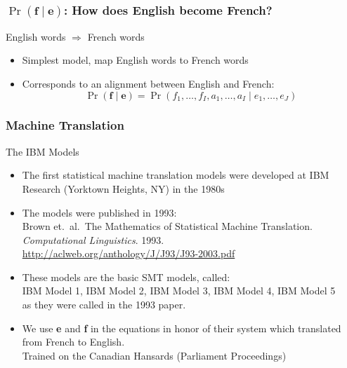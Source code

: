 \begin{frame}
\frametitle{$\Pr( \textbf{f} \mid \textbf{e} )$: How does English become French?}
\begin{alertblock}{English words $\Rightarrow$ French words}
\begin{itemize}
\item Simplest model, map English words to French words
\item Corresponds to an alignment between English and French:
\[ \Pr( \textbf{f} \mid \textbf{e} ) = \Pr(f_1, \ldots, f_I, a_1, \ldots, a_I \mid e_1, \ldots, e_J) \]
\end{itemize}
\end{alertblock}
\end{frame}

\begin{frame}
\frametitle{Machine Translation}
\begin{block}{The IBM Models}
\begin{itemize}[<+->]
\item The first statistical machine translation models were developed at IBM Research (Yorktown Heights, NY) in the 1980s
\item The models were published in 1993: \\
{\small Brown et.\ al.\ The Mathematics of Statistical Machine Translation. \textit{Computational Linguistics}. 1993.} \\
{\small \url{http://aclweb.org/anthology/J/J93/J93-2003.pdf}}
\item These models are the basic SMT models, called: \\
IBM Model 1, IBM Model 2, IBM Model 3, IBM Model 4, IBM Model 5 \\
as they were called in the 1993 paper.
\item We use \textbf{e} and \textbf{f} in the equations in honor of their system which translated from French to English.\\
Trained on the Canadian Hansards (Parliament Proceedings)
\end{itemize}
\end{block}
\end{frame}




